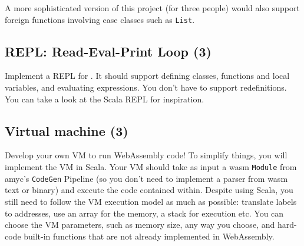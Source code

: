 A more sophisticated version of this project (for three people) would also support foreign
functions involving case classes such as \lstinline{List}.


\subsection{REPL: Read-Eval-Print Loop (3)}
Implement a REPL for \langname.
It should support defining classes, functions and local variables, and evaluating expressions.
You don't have to support redefinitions. You can take a look at the Scala REPL for inspiration.

\subsection{Virtual machine (3)}
Develop your own VM to run WebAssembly code!
To simplify things, you will implement the VM in Scala.
Your VM should take as input
a wasm \lstinline{Module} from amyc's \lstinline{CodeGen} Pipeline
(so you don't need to implement a parser from wasm text or binary)
and execute the code contained within.
Despite using Scala, you still need to follow the VM execution model as much as possible:
translate labels to addresses,
use an array for the memory, a stack for execution etc.
You can choose the VM parameters, such as memory size, any way you choose,
and hard-code built-in functions that are not already implemented in WebAssembly.

